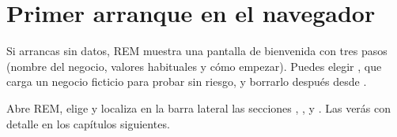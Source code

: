 \section{Primer arranque en el navegador}
Si arrancas sin datos, REM muestra una pantalla de bienvenida con tres pasos (nombre del negocio, valores habituales y cómo empezar). Puedes elegir , que carga un negocio ficticio para probar sin riesgo, y borrarlo después desde .

\begin{checkbox}
Abre REM, elige  y localiza en la barra lateral las secciones , ,  y . Las verás con detalle en los capítulos siguientes.
\end{checkbox}
